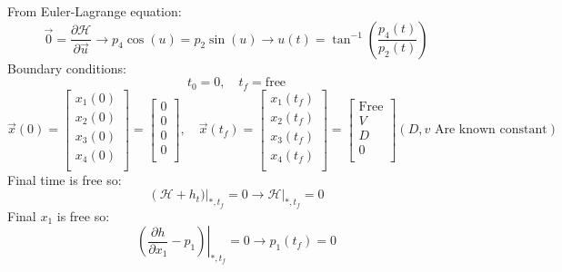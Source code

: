 From Euler-Lagrange equation:
\begin{equation}\label{AnsU}
	{\vec{0}} = \dfrac{\partial \mathcal{H} }{\partial \vec{u}} \to 
	p_4\cos(u) = p_2\sin(u) \to u(t) = \tan^{-1}\left(\dfrac{p_4(t)}{p_2(t)}\right)
\end{equation}
Boundary conditions:
$$t_0 = 0,\quad t_f = \text{free}$$
$$\vec{x}(0) = \begin{bmatrix}
	x_1(0) \\
	x_2(0) \\
	x_3(0) \\
	x_4(0) \\
\end{bmatrix}= \begin{bmatrix}
	0 \\
	0 \\
	0 \\
	0 \\
\end{bmatrix}, \quad
\vec{x}(t_f) = \begin{bmatrix}
	x_1(t_f) \\
	x_2(t_f) \\
	x_3(t_f) \\
	x_4(t_f) \\
\end{bmatrix}= \begin{bmatrix}
	\text{Free} \\
	V \\
	D \\
	0 \\
\end{bmatrix}
(D, v \text{ Are known constant})$$
Final time is free so:
\begin{equation}\label{timeBand}
	\left(\mathcal{H} + h_t)\right \vert_{*, t_f} = 0 \to \mathcal{H} \vert_{*, t_f} = 0 
\end{equation}
Final $x_1$ is free so:
\begin{equation}\label{Solvep_1Q2_a}
	\left.(\dfrac{\partial h}{\partial x_1} - p_1) \right \vert_{*, t_f} = 0 \to p_1(t_f) = 0
\end{equation}

